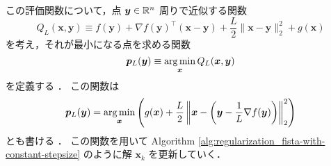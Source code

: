 この評価関数について，点 $\bm{y} \in \mathbb{R}^n$ 周りで近似する関数
\begin{equation}
    Q_L(\bm{x}, \bm{y}) \equiv f(\bm{y})
    + \nabla f(\bm{y})^\top (\bm{x} - \bm{y})
    + \frac{L}{2} \|\bm{x} - \bm{y}\|_2^2 + g(\bm{x})
\end{equation}
を考え，それが最小になる点を求める関数
\begin{equation}
    \bm{p}_L(\bm{y}) \equiv \operatorname*{arg \thinspace min}_{\bm{x}} Q_L(\bm{x}, \bm{y})
\end{equation}
を定義する \cite{Beck2009}．
この関数は
\begin{equation}
    \bm{p}_L(\bm{y}) = \operatorname*{arg \thinspace min}_{\bm{x}} \left(
    g(\bm{x}) + \frac{L}{2} \left\|\bm{x}
    - \left( \bm{y} - \frac{1}{L} \nabla f(\bm{y}) \right) \right\|_2^2
    \right)
\end{equation}
とも書ける \cite{Beck2009}．
この関数を用いて
Algorithm \ref{alg:regularization_fista-with-constant-stepsize}
のように解 $\bm{x}_k$ を更新していく．

